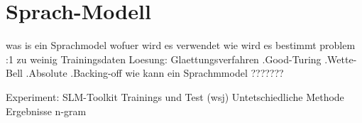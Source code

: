 \section{Sprach-Modell}
was is ein Sprachmodel
wofuer wird es verwendet
wie wird es bestimmt
 problem :1 zu weinig Trainingsdaten
 Loesung: Glaettungsverfahren
		.Good-Turing
		.Wette-Bell
		.Absolute
		.Backing-off
wie kann ein Sprachmmodel ???????

	Experiment:
		SLM-Toolkit
		Trainings und Test (wsj)
		Untetschiedliche Methode
		Ergebnisse
		   n-gram 